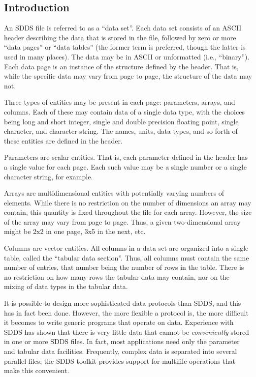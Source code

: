 \documentclass[11pt]{article}
\begin{document}
\subsection{Introduction}

An SDDS file is referred to as a ``data set''.  Each data set consists
of an ASCII header describing the data that is stored in the file,
followed by zero or more ``data pages'' or ``data tables'' (the former
term is preferred, though the latter is used in many places).  The
data may be in ASCII or unformatted (i.e., ``binary'').  Each data
page is an instance of the structure defined by the header.  That is,
while the specific data may vary from page to page, the structure of
the data may not.

Three types of entities may be present in each page: parameters,
arrays, and columns.  Each of these may contain data of a single data
type, with the choices being long and short integer, single and double
precision floating point, single character, and character string.  The
names, units, data types, and so forth of these entities are defined
in the header.

Parameters are scalar entities.  That is, each parameter defined in
the header has a single value for each page.  Each such value may be a
single number or a single character string, for example.

Arrays are multidimensional entities with potentially varying numbers
of elements.  While there is no restriction on the number of
dimensions an array may contain, this quantity is fixed throughout the
file for each array.  However, the size of the array may vary from
page to page.  Thus, a given two-dimensional array might be 2x2 in one
page, 3x5 in the next, etc.

Columns are vector entities.  All columns in a data set are organized
into a single table, called the ``tabular data section''.  Thus, all
columns must contain the same number of entries, that number being the
number of rows in the table.  There is no restriction on how many rows
the tabular data may contain, nor on the mixing of data types in the
tabular data.

It is possible to design more sophisticated data protocols than SDDS,
and this has in fact been done.  However, the more flexible a protocol
is, the more difficult it becomes to write generic programs that
operate on data.  Experience with SDDS has shown that there is very
little data that cannot be {\em conveniently} stored in one or more
SDDS files.  In fact, most applications need only the parameter and
tabular data facilities.  Frequently, complex data is separated into
several parallel files; the SDDS toolkit provides support for
multifile operations that make this convenient.
\end{document}
